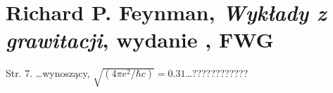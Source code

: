 \documentclass[a4paper,11pt]{article}
\numberwithin{equation}{section}
\begin{document}
\VerSpaceSix












\section{Richard P. Feynman,
  \textit{Wykłady z grawitacji},
  wydanie , FWG }

\vspace{0em}



\vspace{0em}


Str. 7. \ldots wynoszący,
$\sqrt{ ( 4 \pi e^{ 2 } / \hbar c) } = 0.31$\ldots ????????????


\VerSpaceSix
















{}






\end{document}
